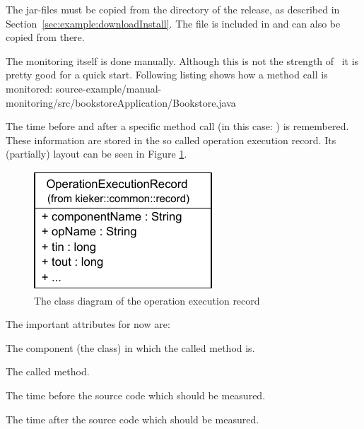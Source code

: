 \noindent The \Kieker{} jar-files must be copied from the  directory %
of the \Kieker{} release, as described in Section~\ref{sec:example:downloadInstall}. %
The file  is included in  %
and can also be copied from there.

The monitoring itself is done manually. Although this is not the strength of \Kieker\ it is pretty good for a quick start. Following listing shows how a method call is monitored:
\setJavaCodeListing
%
{source-example/manual-monitoring/src/bookstoreApplication/Bookstore.java}
 
\noindent The time before and after a specific method call (in this case: ) is remembered. These information are stored in the so called operation execution record. Its (partially) layout can be seen in Figure \ref{Figure:OperationExecutionRecordClassDiagram}.

\begin{figure}[H]
\begin{centering}
\includegraphics[scale=1]{images/kieker_OperationExecutionRecord-notraceattributes}%
\caption{The class diagram of the operation execution record}
\label{Figure:OperationExecutionRecordClassDiagram}
\end{centering}
\end{figure}

\noindent The important attributes for now are:
\begin{compactitem}
\item {} The component (the class) in which the called method is.
\item {} The called method.
\item {} The time before the source code which should be measured.
\item {} The time after the source code which should be measured.
\end{compactitem}

